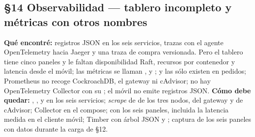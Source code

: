 \subsection*{\S14 Observabilidad --- tablero incompleto y m\'etricas con otros nombres}
\textbf{Qu\'e encontr\'e:} registros JSON en los seis servicios, trazas con el agente OpenTelemetry hacia Jaeger y una traza de compra versionada. Pero el tablero tiene cinco paneles y le faltan disponibilidad Raft, recursos por contenedor y latencia desde el m\'ovil; las m\'etricas se llaman ,  y ;  y las  s\'olo existen en pedidos; Prometheus no recoge CockroachDB, el gateway ni cAdvisor; no hay OpenTelemetry Collector con su ; el m\'ovil no emite registros JSON. \textbf{C\'omo debe quedar:} , ,  y  en los seis servicios; \emph{scrape} de  de los tres nodos, del gateway y de cAdvisor; Collector en el compose;  con los seis paneles, incluida la latencia medida en el cliente m\'ovil; Timber con \'arbol JSON y ; captura de los seis paneles con datos durante la carga de \S12.

